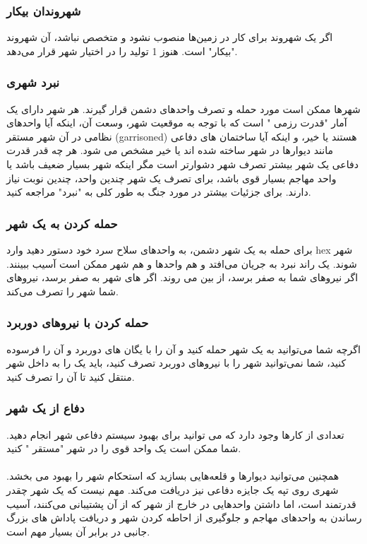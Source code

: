 \documentclass[]{article}
\begin{document}
\subsubsection*{{\titr شهروندان بیکار}}
اگر یک شهروند برای کار در زمین‌­ها منصوب نشود و متخصص نباشد، آن شهروند "بیکار" است. هنوز 1 تولید را در اختیار شهر قرار می‌دهد.

\subsubsection*{{\titr نبرد شهری}}
شهرها ممکن است مورد حمله و تصرف واحدهای دشمن قرار گیرند. هر شهر دارای یک آمار "قدرت رزمی " است که با توجه به موقعیت شهر، وسعت آن، اینکه آیا واحدهای نظامی در آن شهر مستقر (garrisoned) هستند یا خیر، و اینکه آیا ساختمان های دفاعی مانند دیوارها در شهر ساخته شده اند یا خیر مشخص می شود. هر چه قدر قدرت دفاعی یک شهر بیشتر تصرف شهر دشوارتر است مگر اینکه شهر بسیار ضعیف باشد یا واحد مهاجم بسیار قوی باشد، برای تصرف یک شهر چندین واحد، چندین نوبت نیاز دارند. برای جزئیات بیشتر در مورد جنگ به طور کلی به "نبرد" مراجعه کنید.

\subsubsection*{{\titr حمله کردن به یک شهر}}
برای حمله به یک شهر دشمن، به واحد‌های  سلاح سرد خود دستور دهید وارد hex شهر شوند. یک راند نبرد به جریان می‌­افتد و هم واحد­ها و هم شهر ممکن است آسیب ببینند. اگر  نیرو­های شما به صفر برسد، از بین می روند. اگر  های شهر به صفر برسد، نیروهای شما شهر را تصرف می‌کند.


\subsubsection*{{\titr حمله کردن با نیروهای دوربرد}}
اگرچه شما می‌توانید به یک شهر حمله کنید و آن را با یگان های دوربرد و آن را فرسوده کنید، شما نمی‌توانید شهر را با نیروهای دوربرد تصرف کنید، باید یک  را به داخل شهر منتقل کنید تا آن را تصرف کنید.

\subsubsection*{{\titr دفاع از یک شهر}}
تعدادی از کارها وجود دارد که می توانید برای بهبود سیستم دفاعی شهر انجام دهید. شما ممکن است یک واحد قوی را در شهر "مستقر " کنید.\\
\\
همچنین می‌توانید دیوارها و قلعه‌هایی بسازید که استحکام شهر را بهبود می بخشد. شهری روی تپه یک جایزه دفاعی نیز دریافت می‌کند. مهم نیست که یک شهر چقدر قدرتمند است، اما داشتن واحدهایی در خارج از شهر که از آن پشتیبانی می‌کنند، آسیب رساندن به واحدهای مهاجم و جلوگیری از احاطه کردن شهر و دریافت پاداش های بزرگ جانبی در برابر آن بسیار مهم است.\\
\end{document}
